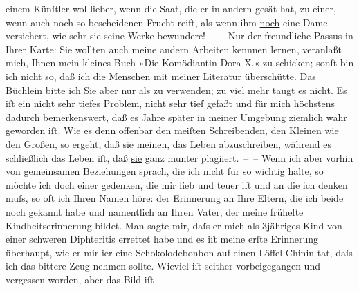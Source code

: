 \begin{ledgroupsized}[t]{13cm}
               einem Künſtler wol lieber, wenn die Saat, die er in andern gesät hat, zu einer, wenn
               auch noch so bescheidenen Frucht reift, als wenn ihm \uline{noch} eine Dame versichert, wie sehr sie seine Werke bewundere! – –\pend
           \pstart
           Nur der freundliche Passus in Ihrer Karte: Sie wollten auch meine andern Arbeiten
               kennnen lernen, veranlaßt mich, Ihnen mein kleines Buch »Die Komödiantin Dora X.« zu schicken; sonſt bin ich nicht so, daß ich die
               Menschen mit meiner Literatur überschütte. Das Büchlein bitte ich Sie\strikeout{,} aber nur als \label{K_L02572-1v}\label{K_L02572-1h} zu verwenden; zu viel mehr taugt es nicht. Es iſt ein nicht sehr tiefes
               Problem, nicht sehr tief gefaßt und für mich höchstens dadurch bemerkenswert, daß es
               Jahre später in meiner Umgebung ziemlich wahr geworden iſt. Wie es denn offenbar den
               meiſten Schreibenden, den Kleinen wie den Großen, so ergeht, {\pb}daß sie meinen, das Leben abzuschreiben, während es schließlich das Leben iſt, daß
                  \uline{sie} ganz munter plagiiert. – –\pend
           \pstart
           Wenn ich aber vorhin von gemeinsamen Beziehungen sprach, die ich nicht für so wichtig
               halte, so möchte ich doch einer gedenken, die mir lieb und teuer iſt und an die ich
               denken muſs, so oft ich Ihren Namen höre: der Erinnerung an Ihre Eltern, die ich beide noch gekannt habe
               und namentlich an Ihren Vater,
               der meine früheſte Kindheitserinnerung bildet. Man sagte mir, daſs er mich als
               3jähriges Kind von einer schweren Diphteritis errettet habe und es iſt meine erſte
               Erinnerung überhaupt, wie er mir i{\geminationm}er eine
               Schokolodebonbon auf einen Löffel Chinin tat, daſs ich das bittere Zeug nehmen
               sollte. Wieviel iſt seither vorbeigegangen und vergessen worden, aber das Bild iſt

\end{ledgroupsized}
